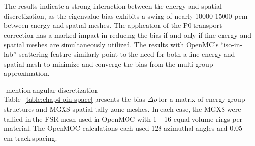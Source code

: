 
The results indicate a strong interaction between the energy and spatial discretization, as the eigenvalue bias exhibits a swing of nearly 10000-15000 pcm between energy and spatial meshes. The application of the P0 transport correction has a marked impact in reducing the bias if and only if fine energy and spatial meshes are simultaneously utilized. The results with OpenMC's ``iso-in-lab'' scattering feature similarly point to the need for both a fine energy and spatial mesh to minimize and converge the bias from the multi-group approximation.

-mention angular discretization \\

Table~\ref{table:chap4-pin-space} presents the bias $\Delta\rho$ for a matrix of energy group structures and \ac{MGXS} spatial tally zone meshes. In each case, the \ac{MGXS} were tallied in the \ac{FSR} mesh used in OpenMOC with 1 -- 16 equal volume rings per material. The OpenMOC calculations each used 128 azimuthal angles and 0.05 cm track spacing.

